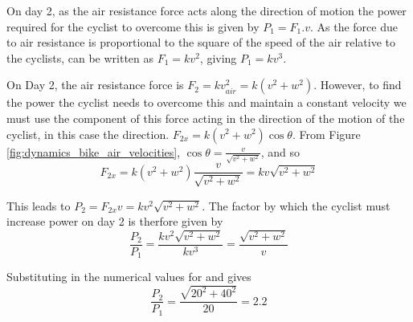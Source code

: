 \begin{problem}
{\begin{enumerate}
On day 2, as the air resistance force acts along the direction of motion the power required for the cyclist to overcome this is given by $P_1 = F_1 . v$. As the force due to air resistance is proportional to the square of the speed of the air relative to the cyclists,  can be written as $F_1 = k v^2$, giving $P_1 = k v^3$.

On Day 2, the air resistance force is $F_2 = k v_{air}^2 = k (v^2 + w^2)$. However, to find the power the cyclist needs to overcome this and maintain a constant velocity we must use the component of this force acting in the direction of the motion of the cyclist, in this case the   direction. $F_{2x} = k (v^2 + w^2) \cos \theta$. From Figure  \ref{fig:dynamics_bike_air_velocities}, $ \cos \theta = \frac{v}{\sqrt{v^2 + w^2}}$, and so 
\begin{equation} F_{2x} = k (v^2 + w^2) \frac{v}{\sqrt{v^2 + w^2}} = kv \sqrt{v^2 + w^2}  \end{equation}

This leads to $P_2 = F_{2x} v = kv^2 \sqrt{v^2 + w^2}$. The factor by which the cyclist must increase power on day 2 is therfore given by
\begin{equation} \frac{P_2}{P_1} = \frac{ kv^2 \sqrt{v^2 + w^2}}{k v^3} = \frac{ \sqrt{v^2 + w^2}}{ v}\end{equation}

Substituting in the numerical values for  and  gives  
\begin{equation}\frac{P_2}{P_1}= \frac{ \sqrt{20^2 + 40^2}}{20} = 2.2\end{equation}

\end{enumerate}
}
\end{problem}
%


